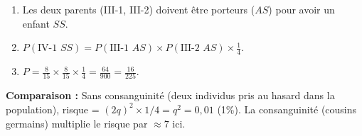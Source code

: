 \documentclass[11pt]{article}
\begin{document}
\begin{exoresolu}
\begin{enumerate}
              \item Les deux parents (III-1, III-2) doivent être porteurs ($AS$) pour avoir un enfant $SS$.
              \item $P(\text{IV-1 } SS) = P(\text{III-1 } AS) \times P(\text{III-2 } AS) \times \frac{1}{4}$.
              \item $P = \frac{8}{15} \times \frac{8}{15} \times \frac{1}{4} = \frac{64}{900} = \frac{16}{225}$.
    \end{enumerate}
    \begin{center}
    \end{center}
    \textbf{Comparaison :} Sans consanguinité (deux individus pris au hasard dans la population), risque = $(2q)^2 \times 1/4 = q^2 = 0,01$ (1\%). La consanguinité (cousins germains) multiplie le risque par $\approx 7$ ici.
\end{exoresolu}
\end{document}
